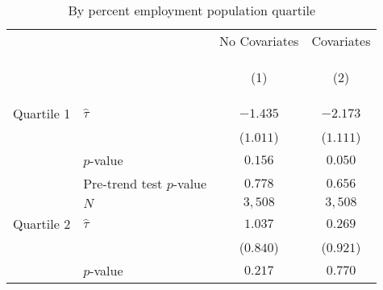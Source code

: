 \begin{table}[tbh]
        \caption{By percent employment population quartile}
        \label{tab:by_percent_employment_population_quartile_lic_only_false}
        \centering
        \vspace{1em}
        \begin{tabular}{llcc}
\toprule
                    &     &                                                                       No Covariates &                                                                          Covariates \\
                    &     & \hypertarget{tabcol:by_percent_employment_population_quartile_lic_only_false1}{(1)} & \hypertarget{tabcol:by_percent_employment_population_quartile_lic_only_false2}{(2)} \\
\midrule
\midrule Quartile 1 & $\hat \tau$ &                                                                            $-1.435$ &                                                                            $-2.173$ \\
                    &     &                                                                           ($1.011$) &                                                                           ($1.111$) \\
                    & $p$-value &                                                                             $0.156$ &                                                                             $0.050$ \\
                    & Pre-trend test $p$-value &                                                                             $0.778$ &                                                                             $0.656$ \\
                    & $N$ &                                                                             $3,508$ &                                                                             $3,508$ \\
\midrule Quartile 2 & $\hat \tau$ &                                                                             $1.037$ &                                                                             $0.269$ \\
                    &     &                                                                           ($0.840$) &                                                                           ($0.921$) \\
                    & $p$-value &                                                                             $0.217$ &                                                                             $0.770$ \\

\end{tabular}
\end{table}
